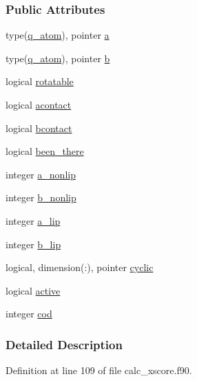 \subsubsection*{Public Attributes}
\begin{DoxyCompactItemize}
\item 
type(\hyperlink{structcalc__xscore_1_1q__atom}{q\-\_\-atom}), pointer \hyperlink{structcalc__xscore_1_1q__bond_a4e8218074e86f8dbf63c27eaf736ddc3}{a}
\item 
type(\hyperlink{structcalc__xscore_1_1q__atom}{q\-\_\-atom}), pointer \hyperlink{structcalc__xscore_1_1q__bond_a3afd307789bc19cc3bbb34ae8745125a}{b}
\item 
logical \hyperlink{structcalc__xscore_1_1q__bond_af71aff797c787a97c7bf478bc18154cb}{rotatable}
\item 
logical \hyperlink{structcalc__xscore_1_1q__bond_aadb2d14ad0bc14fb2d9a288cdab7bd58}{acontact}
\item 
logical \hyperlink{structcalc__xscore_1_1q__bond_aa775de69c3aa30919bc59767dadd7684}{bcontact}
\item 
logical \hyperlink{structcalc__xscore_1_1q__bond_a5bbf0925ba0bdb3c022eba0137249fbc}{been\-\_\-there}
\item 
integer \hyperlink{structcalc__xscore_1_1q__bond_a19cca446eb7c826897ec3d274920b4ac}{a\-\_\-nonlip}
\item 
integer \hyperlink{structcalc__xscore_1_1q__bond_a0553a6f1f22c2f346427b596f16d2ec9}{b\-\_\-nonlip}
\item 
integer \hyperlink{structcalc__xscore_1_1q__bond_a4c412fd95b58c2c8afd3092e8363229d}{a\-\_\-lip}
\item 
integer \hyperlink{structcalc__xscore_1_1q__bond_aa8a2c3d549ed24b0921c400486659cb5}{b\-\_\-lip}
\item 
logical, dimension(\-:), pointer \hyperlink{structcalc__xscore_1_1q__bond_a2e7f9a72e5be34f8c84a34ef289ca481}{cyclic}
\item 
logical \hyperlink{structcalc__xscore_1_1q__bond_a6eb0f245aff0ac9b65972256a0685cdd}{active}
\item 
integer \hyperlink{structcalc__xscore_1_1q__bond_a17d0ee1552e7c2622db67d03d557c04d}{cod}
\end{DoxyCompactItemize}


\subsubsection{Detailed Description}


Definition at line 109 of file calc\-\_\-xscore.\-f90.



